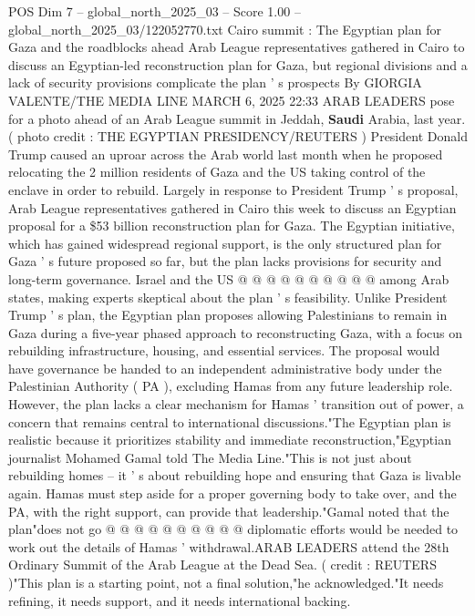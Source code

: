 \begin{textsample}{POS Dim 7 – global\_north\_2025\_03 – Score 1.00 – global\_north\_2025\_03/122052770.txt}  \label{ex:f7_pos_326}
Cairo summit : The Egyptian plan for Gaza and the roadblocks ahead Arab League representatives gathered in Cairo to discuss an Egyptian-led reconstruction plan for Gaza, but regional divisions and a lack of security provisions complicate the plan ' s prospects By GIORGIA VALENTE/THE MEDIA LINE MARCH 6, 2025 22:33 ARAB LEADERS pose for a photo ahead of an Arab League summit in Jeddah, \textbf{Saudi} Arabia, last year. ( photo credit : THE EGYPTIAN PRESIDENCY/REUTERS ) President Donald Trump caused an uproar across the Arab world last month when he proposed relocating the 2 million residents of Gaza and the US taking control of the enclave in order to rebuild.
Largely in response to President Trump ' s proposal, Arab League representatives gathered in Cairo this week to discuss an Egyptian proposal for a \$53 billion reconstruction plan for Gaza.
The Egyptian initiative, which has gained widespread regional support, is the only structured plan for Gaza ' s future proposed so far, but the plan lacks provisions for security and long-term governance.
Israel and the US @ @ @ @ @ @ @ @ @ @ among Arab states, making experts skeptical about the plan ' s feasibility.
Unlike President Trump ' s plan, the Egyptian plan proposes allowing Palestinians to remain in Gaza during a five-year phased approach to reconstructing Gaza, with a focus on rebuilding infrastructure, housing, and essential services.
The proposal would have governance be handed to an independent administrative body under the Palestinian Authority ( PA ), excluding Hamas from any future leadership role.
However, the plan lacks a clear mechanism for Hamas ' transition out of power, a concern that remains central to international discussions."The Egyptian plan is realistic because it prioritizes stability and immediate reconstruction,"Egyptian journalist Mohamed Gamal told The Media Line."This is not just about rebuilding homes -- it ' s about rebuilding hope and ensuring that Gaza is livable again.
Hamas must step aside for a proper governing body to take over, and the PA, with the right support, can provide that leadership."Gamal noted that the plan"does not go @ @ @ @ @ @ @ @ @ @ diplomatic efforts would be needed to work out the details of Hamas ' withdrawal.ARAB LEADERS attend the 28th Ordinary Summit of the Arab League at the Dead Sea. ( credit : REUTERS )"This plan is a starting point, not a final solution,"he acknowledged."It needs refining, it needs support, and it needs international backing.

\end{textsample}
